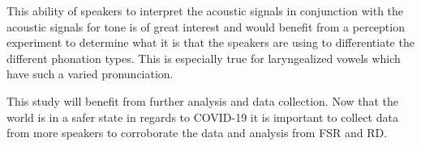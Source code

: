 \documentclass[12pt, letterpaper]{article}
\begin{document}

This ability of speakers to interpret the acoustic signals in conjunction with the acoustic signals for tone is of great interest and would benefit from a perception experiment to determine what it is that the speakers are using to differentiate the different phonation types. This is especially true for laryngealized vowels which have such a varied pronunciation. 

This study will benefit from further analysis and data collection. Now that the world is in a safer state in regards to COVID-19 it is important to collect data from more speakers to corroborate the data and analysis from FSR and RD. 




\printbibliography[heading=bibintoc]
\end{document}
